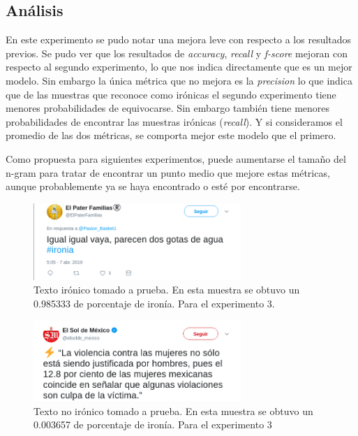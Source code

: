 \subsection{Análisis}
\par En este experimento se pudo notar una mejora leve con respecto a los resultados previos. Se pudo ver que los resultados de \textit{accuracy}, \textit{recall} y \textit{f-score} mejoran con respecto al segundo experimento, lo que nos indica directamente que es un mejor modelo. Sin embargo la única métrica que no mejora es la \textit{precision} lo que indica que de las muestras que reconoce como irónicas el segundo experimento tiene menores probabilidades de equivocarse. Sin embargo también tiene menores probabilidades de encontrar las muestras irónicas (\textit{recall}). Y si consideramos el promedio de las dos métricas, se comporta mejor este modelo que el primero.

\par Como propuesta para siguientes experimentos, puede aumentarse el tamaño del n-gram para tratar de encontrar un punto medio que mejore estas métricas, aunque probablemente ya se haya encontrado o esté por encontrarse.

\begin{figure}
	\centering
	\includegraphics[width=0.7\textwidth]{imagenes/ironia1.png}
	\caption{Texto irónico tomado a prueba. En esta muestra se obtuvo un 0.985333 de porcentaje de ironía. Para el experimento 3.} %
	\label{fig:ironyTest1}
\end{figure}

\begin{figure}
	\centering
	\includegraphics[width=0.7\textwidth]{imagenes/ironia2.png}
	\caption{Texto no irónico tomado a prueba. En esta muestra se obtuvo un 0.003657 de porcentaje de ironía. Para el experimento 3} %
	\label{fig:ironyTest2}
\end{figure}

